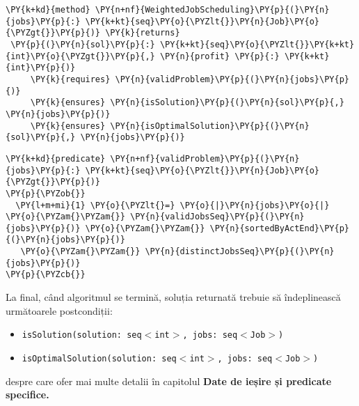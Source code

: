 \begin{Verbatim}[commandchars=\\\{\}, fontsize=\footnotesize]
\PY{k+kd}{method} \PY{n+nf}{WeightedJobScheduling}\PY{p}{(}\PY{n}{jobs}\PY{p}{:} \PY{k+kt}{seq}\PY{o}{\PYZlt{}}\PY{n}{Job}\PY{o}{\PYZgt{}}\PY{p}{)} \PY{k}{returns}
 \PY{p}{(}\PY{n}{sol}\PY{p}{:} \PY{k+kt}{seq}\PY{o}{\PYZlt{}}\PY{k+kt}{int}\PY{o}{\PYZgt{}}\PY{p}{,} \PY{n}{profit} \PY{p}{:} \PY{k+kt}{int}\PY{p}{)}
     \PY{k}{requires} \PY{n}{validProblem}\PY{p}{(}\PY{n}{jobs}\PY{p}{)}
     \PY{k}{ensures} \PY{n}{isSolution}\PY{p}{(}\PY{n}{sol}\PY{p}{,} \PY{n}{jobs}\PY{p}{)}
     \PY{k}{ensures} \PY{n}{isOptimalSolution}\PY{p}{(}\PY{n}{sol}\PY{p}{,} \PY{n}{jobs}\PY{p}{)}
\end{Verbatim}

\begin{Verbatim}[commandchars=\\\{\}, fontsize=\footnotesize]
 \PY{k+kd}{predicate} \PY{n+nf}{validProblem}\PY{p}{(}\PY{n}{jobs}\PY{p}{:} \PY{k+kt}{seq}\PY{o}{\PYZlt{}}\PY{n}{Job}\PY{o}{\PYZgt{}}\PY{p}{)}
\PY{p}{\PYZob{}}
  \PY{l+m+mi}{1} \PY{o}{\PYZlt{}=} \PY{o}{|}\PY{n}{jobs}\PY{o}{|} \PY{o}{\PYZam{}\PYZam{}} \PY{n}{validJobsSeq}\PY{p}{(}\PY{n}{jobs}\PY{p}{)} \PY{o}{\PYZam{}\PYZam{}} \PY{n}{sortedByActEnd}\PY{p}{(}\PY{n}{jobs}\PY{p}{)}
   \PY{o}{\PYZam{}\PYZam{}} \PY{n}{distinctJobsSeq}\PY{p}{(}\PY{n}{jobs}\PY{p}{)}
\PY{p}{\PYZcb{}}
\end{Verbatim}

La final, când algoritmul se termină, soluția returnată trebuie să îndeplinească următoarele postcondiții:
\begin{itemize}
    \item \texttt{isSolution(solution: seq$<$int$>$, jobs: seq$<$Job$>$)}
    
    \item \texttt{isOptimalSolution(solution: seq$<$int$>$, jobs: seq$<$Job$>$)}
\end{itemize}despre care ofer mai multe detalii în capitolul \textbf{Date de ieșire și predicate specifice.}\\

